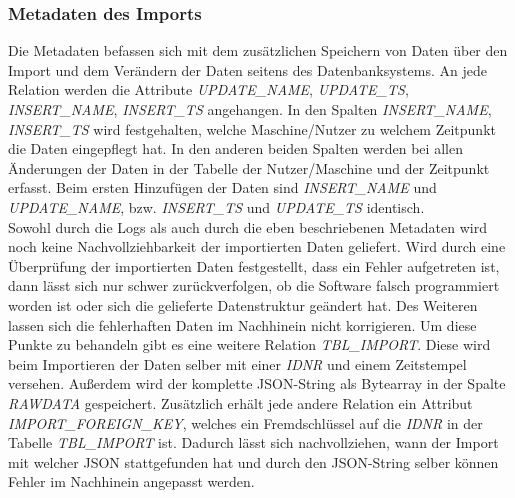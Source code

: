 \subsubsection{Metadaten des Imports}
\label{sec-metadata-import}
Die Metadaten befassen sich mit dem zusätzlichen Speichern von Daten über den Import und dem Verändern der Daten seitens des Datenbanksystems.
An jede Relation werden die Attribute \textit{UPDATE\_NAME}, \textit{UPDATE\_TS}, \textit{INSERT\_NAME}, \textit{INSERT\_TS} angehangen.
In den Spalten \textit{INSERT\_NAME}, \textit{INSERT\_TS} wird festgehalten, welche Maschine/Nutzer zu welchem Zeitpunkt die Daten eingepflegt hat. In den anderen beiden
Spalten werden bei allen Änderungen der Daten in der Tabelle der Nutzer/Maschine und der Zeitpunkt erfasst. Beim ersten Hinzufügen der Daten sind \textit{INSERT\_NAME} und \textit{UPDATE\_NAME}, bzw.
\textit{INSERT\_TS} und \textit{UPDATE\_TS} identisch.\\
Sowohl durch die Logs als auch durch die eben beschriebenen Metadaten wird noch keine Nachvollziehbarkeit der importierten Daten geliefert.
Wird durch eine Überprüfung der importierten Daten festgestellt, dass ein Fehler aufgetreten ist, dann lässt sich nur schwer zurückverfolgen, ob die Software falsch programmiert worden ist
oder sich die gelieferte Datenstruktur geändert hat. Des Weiteren lassen sich die fehlerhaften Daten im Nachhinein nicht korrigieren. Um diese Punkte
zu behandeln gibt es eine weitere Relation \textit{TBL\_IMPORT}. Diese wird beim Importieren der Daten selber mit einer \textit{IDNR} und einem Zeitstempel versehen. Außerdem wird der komplette JSON-String als Bytearray in der Spalte \textit{RAWDATA}
gespeichert. Zusätzlich erhält jede andere Relation ein Attribut \textit{IMPORT\_FOREIGN\_KEY}, welches ein Fremdschlüssel auf die \textit{IDNR} in der Tabelle \textit{TBL\_IMPORT} ist. Dadurch lässt sich nachvollziehen, wann der Import mit welcher JSON
stattgefunden hat und durch den JSON-String selber können Fehler im Nachhinein angepasst werden. 

